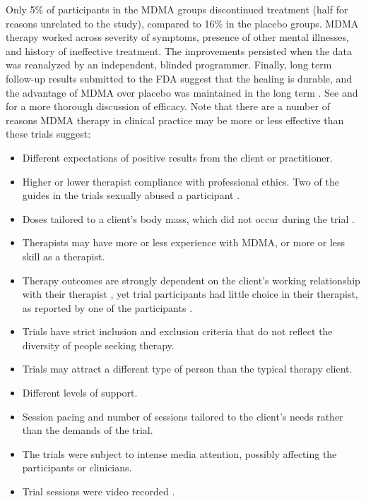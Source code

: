 \documentclass[12pt,letterpaper]{book}
\begin{document}
Only 5\% of participants in the MDMA groups discontinued treatment (half for reasons unrelated to the study), compared to 16\% in the placebo groups. MDMA therapy worked across severity of symptoms, presence of other mental illnesses, and history of ineffective treatment. The improvements persisted when the data was reanalyzed by an independent, blinded programmer. Finally, long term follow-up results submitted to the FDA suggest that the healing is durable, and the advantage of MDMA over placebo was maintained in the long term \cite{mplongPreliminary}. See \textcite{wolfgang2025} and \textcite{icerReport} for a more thorough discussion of efficacy. Note that there are a number of reasons MDMA therapy in clinical practice may be more or less effective than these trials suggest:
\begin{itemize}
    \item Different expectations of positive results from the client or practitioner.
    \item Higher or lower therapist compliance with professional ethics. Two of the guides in the trials sexually abused a participant \cite{powerTrip}.
    \item Doses tailored to a client's body mass, which did not occur during the trial \cite{mitchellMDMAClinicalTrial}.
    \item Therapists may have more or less experience with MDMA, or more or less skill as a therapist.
    \item Therapy outcomes are strongly dependent on the client's working relationship with their therapist \cite{fluckiger2018alliance}, yet trial participants had little choice in their therapist, as reported by one of the participants \cite{kacandaNoChoice}.
    \item Trials have strict inclusion and exclusion criteria that do not reflect the diversity of people seeking therapy.
    \item Trials may attract a different type of person than the typical therapy client.
    \item Different levels of support.
    \item Session pacing and number of sessions tailored to the client's needs rather than the demands of the trial.
    \item The trials were subject to intense media attention, possibly affecting the participants or clinicians.
    \item Trial sessions were video recorded \cite{mitchellMDMAClinicalTrial}.
\end{itemize}
\end{document}
